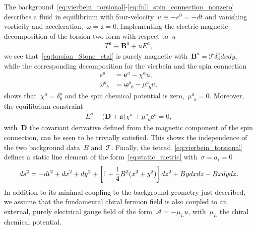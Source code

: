 \documentclass[11pt,a4paper]{article}
\begin{document}
The background~\eqref{eq:vierbein_torsional}-\eqref{eq:full_spin_connection_nonzero} 
describes a fluid in equilibrium with four-velocity~$u\equiv -e^{0}=-dt$ and
vanishing vorticity and acceleration,~$\omega=\mathfrak{a}=0$. 
Implementing the electric-magnetic decomposition of 
the torsion two-form with respect to~$u$ 
\begin{align}
T^{a}\equiv 
\boldsymbol{B}^{a}+uE^{a},
\end{align} 
we see that~\eqref{eq:torsion_Stone_etal} is purely magnetic with~$\boldsymbol{B}^{a}
=\mathcal{T}\delta_{3}^{a}dxdy$,
while the corresponding
decomposition for the vierbein and the spin connection
\begin{align}
e^{a}&=\pmb{\bm{e}}^{a}-\chi^{a}u, \nonumber \\[0.2cm]
\omega^{a}_{\,\,\,b}&=\boldsymbol{\omega}^{a}_{\,\,\,b}-\mu^{a}_{\,\,\,b}u,
\label{eq:spin_connection_EMdecompgen}
\end{align}
shows that~$\chi^{a}=\delta^{a}_{0}$ and
the spin chemical potential is zero,~$\mu^{a}_{\,\,\,b}=0$.
Moreover,
the equilibrium constraint~\cite{Valle:2021nfv}
\begin{align}
E^{a}-\big(\boldsymbol{D}+\mathfrak{a}\big)\chi^{a}+\mu^{a}_{\,\,\,b}\pmb{\bm{e}}^{b}=0,
\label{eq:equilibrium_constr}
\end{align}
with~$\boldsymbol{D}$ the covariant derivative 
defined from the magnetic component
of the spin connection, can be seen to be
trivially satisfied. This shows the independence of the two background data~$B$ and~$\mathcal{T}$.
Finally, the tetrad~\eqref{eq:vierbein_torsional} defines a static line element 
of the form~\eqref{eq:static_metric} 
with~$\sigma=a_{i}=0$
\begin{align}
ds^{2}=-dt^{2}+dx^{2}+dy^{2}+\left[1+{1\over 4}B^{2}(x^{2}+y^{2})\right]dz^{2}
+Bydxdz-Bxdydz.
\label{eq:spatial_metric}
\end{align}
In addition to its minimal coupling to the background geometry just described, we assume  that
the fundamental chiral fermion field is also coupled to an external, purely electrical gauge field of the
form~$\mathcal{A}=-\mu_{L}u$, with~$\mu_{L}$ the chiral chemical potential. 
\end{document}
